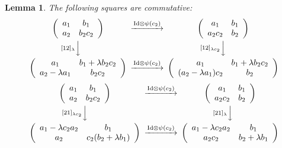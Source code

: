 \documentclass[12pt]{article}
\newtheorem{lemma}{Lemma}
\begin{document}
\begin{lemma}\label{comm-lemma}
  The following squares are commutative: 
  \begin{equation*}
   \begin{CD}
  \left( \begin{array}{cc} a_1 & b_1 \\ a_2 & b_2 c_2 \end{array}\right)   
   @>{\mathrm{Id}\otimes \psi(c_2)}>>  
 \left( \begin{array}{cc} a_1 & b_1 \\ a_2c_2 & b_2  \end{array}\right)   
   \\
     @V{[12]_{\lambda}}VV      @V{[12]_{\lambda c_2}}VV    \\
    \left( \begin{array}{cc} a_1 & b_1+\lambda b_2 c_2 \\ a_2-\lambda a_1 & 
    b_2 c_2 \end{array}\right)   
    @>{\mathrm{Id}\otimes \psi(c_2)}>> 
    \left( \begin{array}{cc} a_1 & b_1+\lambda b_2 c_2 \\ (a_2-\lambda a_1)c_2 & 
    b_2  \end{array}\right)   
   \end{CD}
 \end{equation*}
 \begin{equation*}
   \begin{CD}
  \left( \begin{array}{cc} a_1 & b_1 \\ a_2 & b_2 c_2 \end{array}\right)   
   @>{\mathrm{Id}\otimes \psi(c_2)}>>  
 \left( \begin{array}{cc} a_1 & b_1 \\ a_2c_2 & b_2  \end{array}\right)   
   \\
     @V{[21]_{\lambda c_2}}VV      @V{[21]_{\lambda}}VV    \\
    \left( \begin{array}{cc} a_1-\lambda c_2 a_2 & b_1 \\ 
   a_2 & 
    c_2 (b_2+\lambda b_1)  \end{array}\right)   
    @>{\mathrm{Id}\otimes \psi(c_2)}>> 
    \left( \begin{array}{cc} a_1-\lambda c_2 a_2 & b_1 \\ 
   a_2 c_2  & 
    b_2 +\lambda b_1 \end{array}\right)   
   \end{CD}
 \end{equation*}
\end{lemma} 
\end{document}
